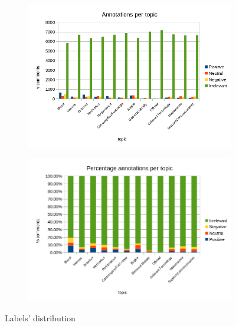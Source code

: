 \begin{figure}[ht]
	\centering
	\begin{subfigure}{1\textwidth} %
		\includegraphics[width=1\textwidth]{figures/charts/annotations-distribution.png}
		\label{fig:annotations-distribution}
	\end{subfigure}
	\vspace{-1cm} %
	\begin{subfigure}{1\textwidth} %
		\includegraphics[width=1\textwidth]{figures/charts/annotations-distribution-perc.png}
		\label{fig:annotations-distribution-perc}
	\end{subfigure}
	\caption{Labels' distribution} %
	\label{fig:annotations}
\end{figure}


